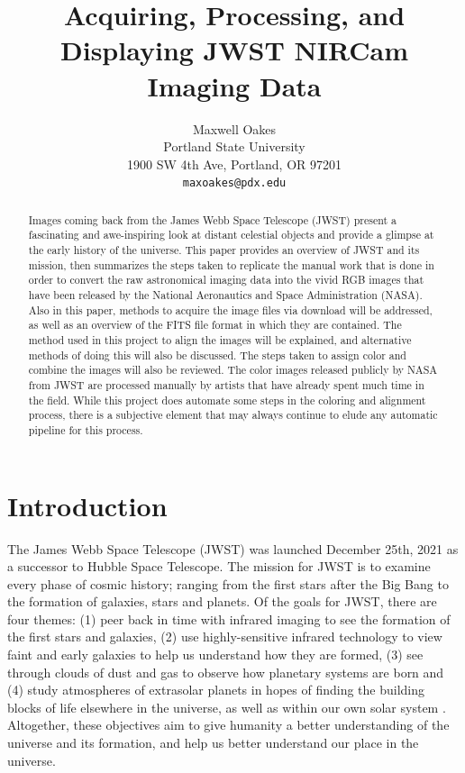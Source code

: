 \documentclass[10pt,twocolumn,letterpaper]{article}
\begin{document}
\title{Acquiring, Processing, and Displaying JWST NIRCam Imaging Data}
\cvprfinaltrue

\author{Maxwell Oakes\\
Portland State University\\
1900 SW 4th Ave, Portland, OR 97201\\
{\tt\small maxoakes@pdx.edu}}
\maketitle

\begin{abstract}
  Images coming back from the James Webb Space Telescope (JWST) present a fascinating and awe-inspiring look at distant celestial objects and provide a glimpse at the early history of the universe. 
  This paper provides an overview of JWST and its mission, then summarizes the steps taken to replicate the manual work that is done in order to convert the raw astronomical imaging data into the vivid RGB images that have been released by the National Aeronautics and Space Administration (NASA). 
  Also in this paper, methods to acquire the image files via download will be addressed, as well as an overview of the FITS file format in which they are contained.
  The method used in this project to align the images will be explained, and alternative methods of doing this will also be discussed. The steps taken to assign color and combine the images will also be reviewed.
  The color images released publicly by NASA from JWST are processed manually by artists that have already spent much time in the field. While this project does automate some steps in the coloring and alignment process, there is a subjective element that may always continue to elude any automatic pipeline for this process.
\end{abstract}

\section{Introduction}
\label{sec:intro}

The James Webb Space Telescope (JWST) was launched December 25th, 2021 as a successor to Hubble Space Telescope. The mission for JWST is to examine every phase of cosmic history; ranging from the first stars after the Big Bang to the formation of galaxies, stars and planets. Of the goals for JWST, there are four themes: 
(1) peer back in time with infrared imaging to see the formation of the first stars and galaxies, 
(2) use highly-sensitive infrared technology to view faint and early galaxies to help us understand how they are formed,
(3) see through clouds of dust and gas to observe how planetary systems are born
and (4) study atmospheres of extrasolar planets in hopes of finding the building blocks of life elsewhere in the universe, as well as within our own solar system \cite{webbobjective}.
Altogether, these objectives aim to give humanity a better understanding of the universe and its formation, and help us better understand our place in the universe.
\end{document}
